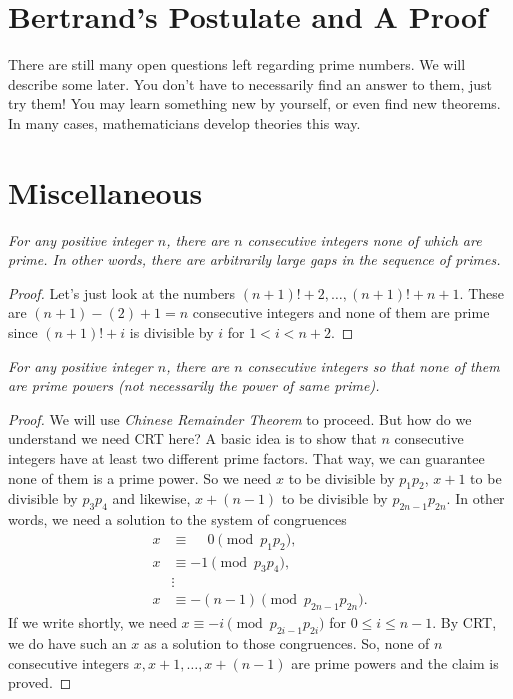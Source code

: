 \documentclass{subfiles}
\begin{document}
	\section{Bertrand's Postulate and A Proof}\label{sec:bertrand}
		
		There are still many open questions left regarding prime numbers. We will describe some later. You don't have to necessarily find an answer to them, just try them! You may learn something new by yourself, or even find new theorems. In many cases, mathematicians develop theories this way.

	\section{Miscellaneous}
	\label{sec:theoremsinprimes}

	\begin{theorem}\slshape
		For any positive integer $n$, there are $n$ consecutive integers none of which are prime. In other words, there are arbitrarily large gaps in the sequence of primes.
	\end{theorem}

	\begin{proof}
		Let's just look at the numbers $(n+1)!+2,\ldots,(n+1)!+n+1$. These are $(n+1)-(2)+1=n$ consecutive integers and none of them are prime since $(n+1)!+i$ is divisible by $i$ for $1<i<n+2$.
	\end{proof}

	\begin{theorem}\slshape
		For any positive integer $n$, there are $n$ consecutive integers so that none of them are prime powers (not necessarily the power of same prime).
	\end{theorem}

	\begin{proof}
		We will use \textit{Chinese Remainder Theorem} to proceed. But how do we understand we need CRT here? A basic idea is to show that $n$ consecutive integers have at least two different prime factors. That way, we can guarantee none of them is a prime power. So we need $x$ to be divisible by $p_1p_2$, $x+1$ to be divisible by $p_3p_4$ and likewise, $x+(n-1)$ to be divisible by $p_{2n-1}p_{2n}$. In other words, we need a solution to the system of congruences
			\begin{align*}
				x & \equiv \phantom{-} 0  \pmod {p_1p_2},\\
				x & \equiv -1  \pmod{p_3p_4},\\
				  &  \vdots \\
				x & \equiv -(n-1) \pmod{p_{2n-1}p_{2n}}.
			\end{align*}
		If we write shortly, we need $x\equiv-i\pmod{p_{2i-1}p_{2i}}$ for $0\leq i\leq n-1$. By CRT, we do have such an $x$ as a solution to those congruences. So, none of $n$ consecutive integers $x, x+1, \ldots, x+(n-1)$ are prime powers and the claim is proved.
	\end{proof}
\end{document}
